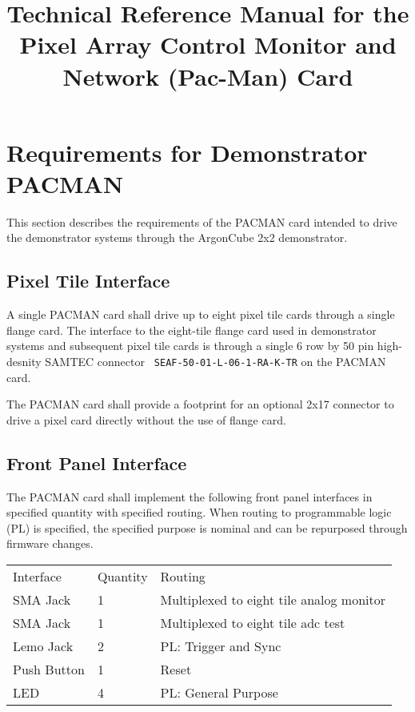 \documentclass[12pt]{article}
\begin{document}
\title{Technical Reference Manual for the Pixel Array Control Monitor and Network (Pac-Man) Card}

\maketitle

\section{Requirements for Demonstrator PACMAN}

This section describes the requirements of the PACMAN card intended to
drive the demonstrator systems through the ArgonCube 2x2 demonstrator.

\subsection{Pixel Tile Interface}

A single PACMAN card shall drive up to eight pixel tile cards through
a single flange card.  The interface to the eight-tile flange card
used in demonstrator systems and subsequent pixel tile cards is
through a single 6 row by 50 pin high-desnity SAMTEC connector {\tt
  SEAF-50-01-L-06-1-RA-K-TR} on the PACMAN card.

The PACMAN card shall provide a footprint for an optional 2x17
connector to drive a pixel card directly without the use of flange
card.

\subsection{Front Panel Interface}

The PACMAN card shall implement the following front panel interfaces
in specified quantity with specified routing.  When routing to
programmable logic (PL) is specified, the specified purpose is nominal
and can be repurposed through firmware changes.

\begin{center}
\begin{tabular}{lll}
Interface   & Quantity & Routing \\
SMA Jack    & 1 & Multiplexed to eight tile analog monitor \\
SMA Jack    & 1 & Multiplexed to eight tile adc test \\
Lemo Jack   & 2 & PL: Trigger and Sync \\
Push Button & 1 & Reset \\
LED         & 4 & PL: General Purpose
\end{tabular}
\end{center}
\end{document}
